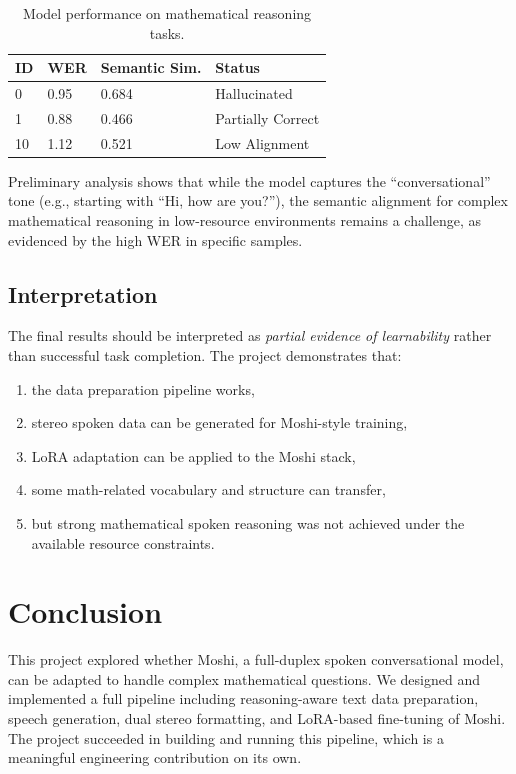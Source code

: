\documentclass[12pt,a4paper]{article}
\begin{document}
\begin{table}[h]
\centering
\begin{tabular}{@{}llll@{}}
\toprule
ID & WER & Semantic Sim. & Status \\ \midrule
0  & 0.95 & 0.684 & Hallucinated \\
1  & 0.88 & 0.466 & Partially Correct \\
10 & 1.12 & 0.521 & Low Alignment \\ \bottomrule
\end{tabular}
\caption{Model performance on mathematical reasoning tasks.}
\end{table}

Preliminary analysis shows that while the model captures the ``conversational'' tone (e.g., starting with ``Hi, how are you?''), the semantic alignment for complex mathematical reasoning in low-resource environments remains a challenge, as evidenced by the high WER in specific samples.

\subsection{Interpretation}
The final results should be interpreted as \emph{partial evidence of learnability} rather than successful task completion. The project demonstrates that:
\begin{enumerate}[leftmargin=1.5em]
    \item the data preparation pipeline works,
    \item stereo spoken data can be generated for Moshi-style training,
    \item LoRA adaptation can be applied to the Moshi stack,
    \item some math-related vocabulary and structure can transfer,
    \item but strong mathematical spoken reasoning was not achieved under the available resource constraints.
\end{enumerate}

\section{Conclusion}
This project explored whether Moshi, a full-duplex spoken conversational model, can be adapted to handle complex mathematical questions. We designed and implemented a full pipeline including reasoning-aware text data preparation, speech generation, dual stereo formatting, and LoRA-based fine-tuning of Moshi. The project succeeded in building and running this pipeline, which is a meaningful engineering contribution on its own.
\end{document}
